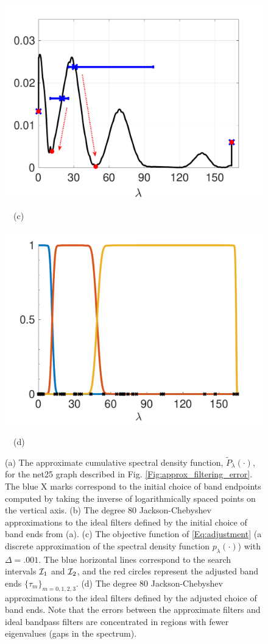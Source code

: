 \documentclass[journal, 10pt]{IEEEtran}
\begin{document}
\begin{figure}[tb]
\begin{minipage}[m]{0.49\linewidth}
\centerline{\includegraphics[width=1.1\linewidth]{fig_pdf}}
\centerline{~~\small{(c)}}
\end{minipage}
\begin{minipage}[m]{0.49\linewidth}
\centerline{\includegraphics[width=1.1\linewidth]{fig_updated_fb}}
\centerline{~~\small{(d)}}
\end{minipage}
\caption{{(a) The approximate cumulative spectral density function, $\tilde{P}_{\lambda}(\cdot),$ for the net25 graph described in Fig. \ref{Fig:approx_filtering_error}. The blue X marks correspond to the initial choice of band endpoints computed by taking the inverse of logarithmically spaced points on the vertical axis. (b) The degree 80 Jackson-Chebyshev approximations to the ideal filters defined by the initial choice of band ends from (a). (c) The objective function of \eqref{Eq:adjustment} (a discrete approximation of the spectral density function $p_{\lambda}(\cdot)$) with $\Delta=.001$. The blue horizontal lines correspond to the search intervals ${\cal I}_1$ and ${\cal I}_2$, and the red circles represent the adjusted band ends $\{\tau_m\}_{m=0,1,2,3}$. (d) The degree 80 Jackson-Chebyshev approximations to the ideal filters defined by the adjusted choice of band ends. Note that the errors between the approximate filters and ideal bandpass filters are concentrated in regions with fewer eigenvalues (gaps in the spectrum).}}\label{Fig:fb_design}

\end{figure}
\end{document}
